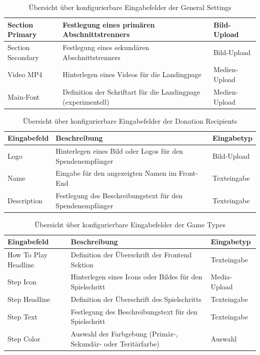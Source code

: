 \documentclass[
	ngerman,
	BCOR=8mm,
	headings=normal,
	parskip=half,
	headsepline,
	automark,
	listof=totoc,
	bibliography=totoc,
]{scrreprt}
\begin{document}
\begin{table}[h]
\begin{tabular}{|p{3cm}|p{6cm}|p{5cm}|}
        \hline
        Section Primary & Festlegung eines primären Abschnittstrenners & Bild-Upload \\
        \hline
        Section Secondary & Festlegung eines sekundären Abschnittstrenners & Bild-Upload \\
        \hline
        Video MP4 & Hinterlegen eines Videos für die Landingpage & Medien-Upload \\
        \hline
        Main-Font & Definition der Schriftart für die Landingpage (experimentell) & Medien-Upload \\
        \hline
    \end{tabular}
    \caption{Übersicht über konfigurierbare Eingabefelder der General Settings}
    \label{tab:eingabefelder_general_settings}
\end{table}

\begin{table}[h]
    \centering
    \renewcommand{\arraystretch}{1.3}
    \begin{tabular}{|p{3cm}|p{6cm}|p{5cm}|}
        \hline
        \textbf{Eingabefeld} & \textbf{Beschreibung} & \textbf{Eingabetyp} \\
        \hline
        Logo & Hinterlegen eines Bild oder Logos für den Spendenempfänger & Bild-Upload \\
        \hline
        Name & Eingabe für den angezeigten Namen im Front-End & Texteingabe \\
        \hline
        Description & Festlegung des Beschreibungstext für den Spendenempfänger  & Texteingabe \\
        \hline
    \end{tabular}
    \caption{Übersicht über konfigurierbare Eingabefelder der Donation Recipients}
    \label{tab:eingabefelder_donation_recipients}
\end{table}

\begin{table}[h]
    \centering
    \renewcommand{\arraystretch}{1.3}
    \begin{tabular}{|p{3cm}|p{6cm}|p{5cm}|}
        \hline
        \textbf{Eingabefeld} & \textbf{Beschreibung} & \textbf{Eingabetyp} \\
        \hline
        How To Play Headline & Definition der Überschrift der Frontend Sektion & Texteingabe \\
        \hline
        Step Icon & Hinterlegen eines Icons oder Bildes für den Spielschritt & Media-Upload \\
        \hline
        Step Headline & Definition der Überschrift des Spielschritts & Texteingabe \\
        \hline
        Step Text & Festlegung des Beschreibungstext für den Spielschritt  & Texteingabe \\
        \hline
        Step Color & Auswahl der Farbgebung (Primär-, Sekundär- oder Teritärfarbe)  & Auswahl \\
        \hline
    \end{tabular}
    \caption{Übersicht über konfigurierbare Eingabefelder der Game Types}
    \label{tab:eingabefelder_game_types}
\end{table}
\end{document}
